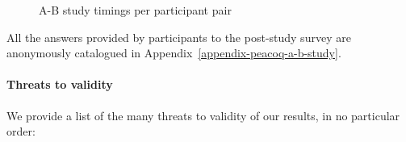 \begin{figure}
\caption{\PeaCoq{} A-B study timings per participant pair}
\label{peacoq-a-b-study-cumulative}
\end{figure}

All the answers provided by participants to the post-study survey are
anonymously catalogued in Appendix~\ref{appendix-peacoq-a-b-study}.

\paragraph{Threats to validity}

We provide a list of the many threats to validity of our results, in no
particular order:

